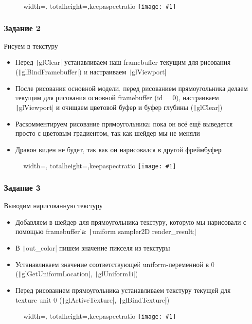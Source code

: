 \documentclass{beamer}
\newcommand{\slideimage}[1]{
  \begin{figure}
    \begin{adjustbox}{width=\textwidth, totalheight=\textheight-2\baselineskip-2\baselineskip,keepaspectratio}
      \texttt{[image: \#1]}
    \end{adjustbox}
  \end{figure}
}
\begin{document}
\begin{frame}[fragile]
\slideimage{1.png}
\end{frame}

\begin{frame}[fragile]
\frametitle{Задание 2}
Рисуем в текстуру
\begin{itemize}
\item Перед \texttt|glClear| устанавливаем наш framebuffer текущим для рисования (\texttt|glBindFramebuffer|) и настраиваем \texttt|glViewport|
\item После рисования основной модели, перед рисованием прямоугольника делаем текущим для рисования основной framebuffer (id = 0), настраиваем \texttt|glViewport| и очищаем цветовой буфер и буфер глубины (\texttt|glClear|)
\item Раскомментируем рисование прямоугольника: пока он всё ещё выведется просто с цветовым градиентом, так как шейдер мы не меняли
\item Дракон виден не будет, так как он нарисовался в другой фреймбуфер
\end{itemize}
\end{frame}

\begin{frame}[fragile]
\slideimage{2.png}
\end{frame}

\begin{frame}[fragile]
\frametitle{Задание 3}
Выводим нарисованную текстуру
\begin{itemize}
\item Добавляем в шейдер для прямоугольника текстуру, которую мы нарисовали с помощью framebuffer'а: \texttt|uniform sampler2D render_result;|
\item В \texttt|out_color| пишем значение пикселя из текстуры
\item Устанавливаем значение соответствующей uniform-переменной в 0 (\texttt|glGetUniformLocation|, \texttt|glUniform1i|)
\item Перед рисованием прямоугольника устанавливаем текстуру текущей для texture unit 0 (\texttt|glActiveTexture|, \texttt|glBindTexture|)
\end{itemize}
\end{frame}

\begin{frame}[fragile]
\slideimage{3.png}
\end{frame}
\end{document}
